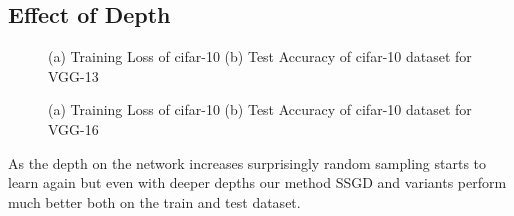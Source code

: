 \documentclass[a4paper,twoside]{iiththesis}
\theoremstyle{definition}
\theoremstyle{definition}
\theoremstyle{remark}
\begin{document}
\subsection{Effect of Depth}
\begin{figure}
%
%
\caption{(a) Training Loss of cifar-10 (b) Test Accuracy of cifar-10 dataset for VGG-13}
%
%
\caption{(a) Training Loss of cifar-10 (b) Test Accuracy of cifar-10 dataset for VGG-16}
\label{cifar-10}
\end{figure}
As the depth on the network increases surprisingly random sampling starts to learn again but even with deeper depths our method SSGD and variants perform much better both on the train and test dataset.
\newpage
\end{document}
